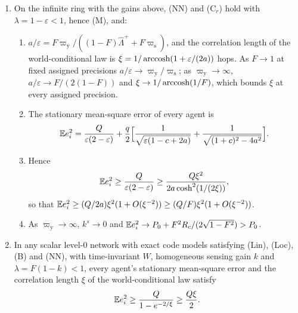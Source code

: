 \begin{theorem}\label{thm:coh-grounding-tension}
\begin{enumerate}\renewcommand{\labelenumi}{(\alph{enumi})}
\item On the infinite ring with the gains above, \textup{(NN)} and \textup{(C$_r$)} hold with $\lambda=1-\varepsilon<1$, hence \textup{(M)}, and:
\begin{enumerate}\renewcommand{\labelenumii}{(\roman{enumii})}
\item $a/\varepsilon=F\varpi_{\mathrm y}/((1-F)\hat\Lambda^++F\varpi_{\mathrm s})$, and the correlation length of the world-conditional law is $\xi=1/\operatorname{arccosh}(1+\varepsilon/(2a))$ hops. As $F\to1$ at fixed assigned precisions $a/\varepsilon\to\varpi_{\mathrm y}/\varpi_{\mathrm s}$; as $\varpi_{\mathrm y}\to\infty$, $a/\varepsilon\to F/(2(1-F))$ and $\xi\to1/\operatorname{arccosh}(1/F)$, which bounds $\xi$ at every assigned precision.
\item The stationary mean-square error of every agent is
\begin{equation}\label{eq:coh-ring-mse}
\mathbb{E} e_i^2=\frac{Q}{\varepsilon(2-\varepsilon)}+\frac q2\Bigl[\frac{1}{\sqrt{\varepsilon(1-c+2a)}}+\frac{1}{\sqrt{(1+c)^2-4a^2}}\Bigr].
\end{equation}
\item Hence
\begin{equation}\label{eq:coh-tension-law}
\mathbb{E} e_i^2\ge\frac{Q}{\varepsilon(2-\varepsilon)}\ge\frac{Q\xi^2}{2a\cosh^2(1/(2\xi))},
\end{equation}
so that $\mathbb{E} e_i^2\ge(Q/2a)\xi^2(1+O(\xi^{-2}))\ge(Q/F)\xi^2(1+O(\xi^{-2}))$.
\item As $\varpi_{\mathrm y}\to\infty$, $k^s\to0$ and $\mathbb{E} e_i^2\to P_0+F^2R_c/(2\sqrt{1-F^2})>P_0$.
\end{enumerate}
\item In any scalar level-0 network with exact code models satisfying \textup{(Lin)}, \textup{(Loc)}, \textup{(B)} and \textup{(NN)}, with time-invariant $W$, homogeneous sensing gain $k$ and $\lambda=F(1-k)<1$, every agent's stationary mean-square error and the correlation length $\xi$ of the world-conditional law satisfy
\[ \mathbb{E} e_i^2\ge\frac{Q}{1-e^{-2/\xi}}\ge\frac{Q\xi}{2}. \]
\end{enumerate}
\end{theorem}

